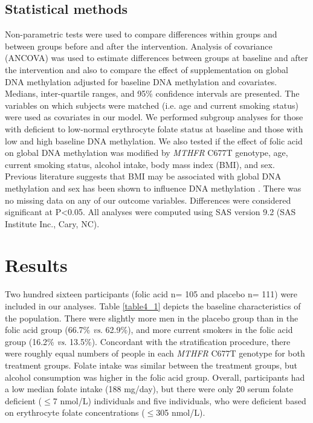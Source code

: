 \subsection{Statistical methods} %
\noindent Non-parametric tests were used to compare differences within groups and between groups before and after the intervention. Analysis of covariance (ANCOVA) was used to estimate differences between groups at baseline and after the intervention and also to compare the effect of supplementation on global DNA methylation adjusted for baseline DNA methylation and covariates. Medians, inter-quartile ranges, and 95\% confidence intervals are presented. The variables on which subjects were matched (i.e. age and current smoking status) were used as covariates in our model. We performed subgroup analyses for those with deficient to low-normal erythrocyte folate status at baseline and those with low and high baseline DNA methylation. We also tested if the effect of folic acid on global DNA methylation was modified by \emph{MTHFR} C677T genotype, age, current smoking status, alcohol intake, body mass index (BMI), and sex. Previous literature suggests that BMI may be associated with global DNA methylation \cite{c429,c430} and sex has been shown to influence DNA methylation \cite{c431,c432,c433}. There was no missing data on any of our outcome variables. Differences were considered significant at P<0.05. All analyses were computed using SAS version 9.2 (SAS Institute Inc., Cary, NC). 
 
\section[]{Results} %
\noindent Two hundred sixteen participants (folic acid n= 105 and placebo n= 111) were included in our analyses. Table \ref{table4_1} depicts the baseline characteristics of the population. There were slightly more men in the placebo group than in the folic acid group (66.7\% \emph{vs}. 62.9\%), and more current smokers in the folic acid group (16.2\% \emph{vs}. 13.5\%). Concordant with the stratification procedure, there were roughly equal numbers of people in each \emph{MTHFR} C677T genotype for both treatment groups. Folate intake was similar between the treatment groups, but alcohol consumption was higher in the folic acid group. Overall, participants had a low median folate intake (188 mg/day), but there were only 20 serum folate deficient ($\leq$7 nmol/L) individuals and five individuals, who were deficient based on erythrocyte folate concentrations ($\leq$305 nmol/L).
 
